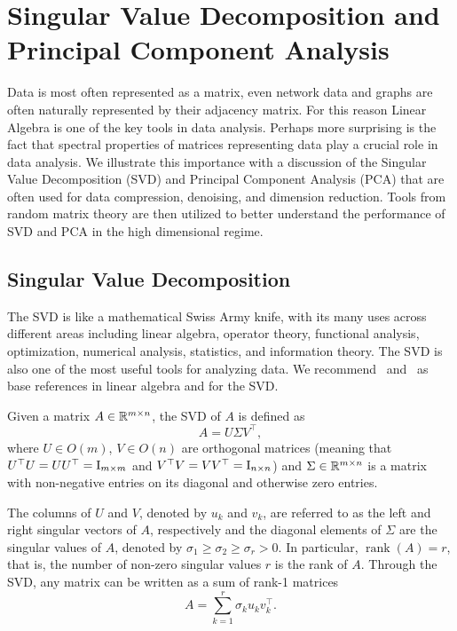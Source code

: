 \chapter{Singular Value Decomposition and Principal Component Analysis}
\label{c:svd}



Data is most often represented as a matrix, even network data and graphs are often naturally represented by their adjacency matrix. For this reason Linear Algebra is one of the key tools in data analysis. Perhaps more surprising is the fact that spectral properties of matrices representing data play a crucial role in data analysis. We illustrate this importance with a discussion of the Singular Value Decomposition (SVD) and Principal Component Analysis (PCA) that are often used for data compression, denoising, and dimension reduction. Tools from random matrix theory are then utilized to better understand the performance of SVD and PCA in the high dimensional regime.

\section{Singular Value Decomposition}


The SVD is like a mathematical Swiss Army knife, with its many uses across different areas including linear algebra, operator theory, functional analysis, optimization, numerical analysis, statistics, and information theory. The SVD is also one of the most useful tools for analyzing data. We recommend~\cite{HJ90} and~\cite{Golub_MatrixComputations} as base references in linear algebra and for the SVD.






Given a matrix $A\in\mathbb{R}^{m\times n}$, the SVD of $A$ is defined as
\begin{equation}\label{eq:SVD:PCAnotes}
 A = U \Sigma V^\top  ,
\end{equation}
where $U\in O(m)$, $V\in O(n)$ are orthogonal matrices (meaning that $U^\top  U = UU^\top   =\operatorname{I}_{m\times m}$ and $V^\top  V = VV^\top   = \operatorname{I}_{n\times n}$) and $\Sigma\in\mathbb{R}^{m\times n}$ is a matrix with non-negative entries on its diagonal and otherwise zero entries.

The columns of $U$ and $V$, denoted by $u_k$ and $v_k$, are referred to as the left and right singular vectors of $A$, respectively and the diagonal elements of $\Sigma$ are the singular values of $A$, denoted
by $\sigma_1 \geq \sigma_2 \geq \sigma_r > 0$. 
In particular, $\operatorname{rank}(A)=r$, that is, the number of non-zero singular values $r$ is the rank of $A$.
Through the SVD, any matrix can be written as a sum of rank-1 matrices
\begin{equation}\label{eq:svdrank1sum}
A = \sum_{k=1}^r \sigma_k u_k v_k^\top  .
\end{equation}

